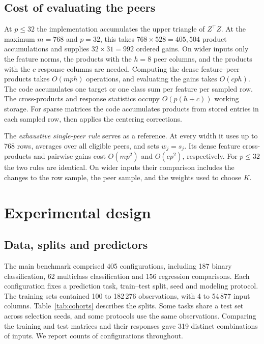 \documentclass[11pt,a4paper]{article}
\begin{document}
\subsection{Cost of evaluating the peers}
At $p\le32$ the implementation accumulates the upper triangle of $Z^\top Z$. At the maximum $m=768$ and $p=32$, this takes $768\times528=405{,}504$ product accumulations and supplies $32\times31=992$ ordered gains. On wider inputs only the feature norms, the products with the $h=8$ peer columns, and the products with the $c$ response columns are needed. Computing the dense feature--peer products takes $O(mph)$ operations, and evaluating the gains takes $O(cph)$. The code accumulates one target or one class sum per feature per sampled row. The cross-products and response statistics occupy $O(p(h+c))$ working storage. For sparse matrices the code accumulates products from stored entries in each sampled row, then applies the centering corrections.

The \emph{exhaustive single-peer rule} serves as a reference. At every width it uses up to 768 rows, averages over all eligible peers, and sets $w_j=s_j$. Its dense feature cross-products and pairwise gains cost $O(mp^2)$ and $O(cp^2)$, respectively. For $p\le32$ the two rules are identical. On wider inputs their comparison includes the changes to the row sample, the peer sample, and the weights used to choose $K$.

\section{Experimental design}\label{sec:exp}
\subsection{Data, splits and predictors}
The main benchmark comprised 405 configurations, including 187 binary classification, 62 multiclass classification and 156 regression comparisons. Each configuration fixes a prediction task, train--test split, seed and modeling protocol. The training sets contained 100 to 182\,276 observations, with 4 to 54\,877 input columns. Table~\ref{tab:cohorts} describes the splits. Some tasks share a test set across selection seeds, and some protocols use the same observations. Comparing the training and test matrices and their responses gave 319 distinct combinations of inputs. We report counts of configurations throughout.
\end{document}

